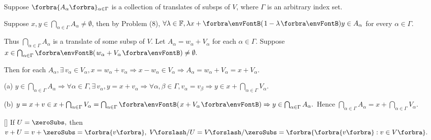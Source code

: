 \par\quad
Suppose $\Bra{A_{\alpha}}{_{\alpha\in\Gamma}}$ is a collection of translates of subsps of $V$, where $\Gamma$ is an arbitrary index set.\vspace{8pt}\par\quad
Suppose $x,y\in\bigcap_{\alpha\in\Gamma}A_{\alpha}\neq\emptyset$, then by Problem (8), $\forall\lambda\in\Fbb,\lambda x+\Par{1-\lambda}y\in A_{\alpha}$ for every $\alpha\in\Gamma$.\par\quad
Thus $\bigcap_{\alpha\in\Gamma}A_\alpha$ is a translate of some subsp of $V$.\PfEnd\vspace{6pt}\quad
\Or Let $A_\alpha=w_\alpha+V_\alpha$ for each $\alpha\in\Gamma$. Suppose $x\in\bigcap_{\alpha\in\Gamma}\Par{w_\alpha+V_\alpha}\neq\emptyset.$\par\quad
Then for each $A_\alpha,\exists\,v_\alpha\in V_\alpha,x=w_\alpha+v_\alpha\Rightarrow x-w_\alpha\in V_\alpha\Rightarrow A_\alpha=w_\alpha+V_\alpha=x+V_\alpha.$\vspace{3pt}\par\quad
(a) $y\in\bigcap_{\alpha\in\Gamma}A_\alpha\Rightarrow\forall\alpha\in\Gamma,\exists\,v_\alpha,y=x+v_\alpha\Rightarrow\forall\alpha,\beta\in\Gamma,v_\alpha=v_\beta\Rightarrow y\in x+\bigcap_{\alpha\in\Gamma}V_\alpha.$\vspace{3pt}\par\quad
(b) $y=x+v\in x+\bigcap_{\alpha\in\Gamma}V_\alpha=\bigcap_{\alpha\in\Gamma}\Par{x+V_\alpha}\Rightarrow y\in\bigcap_{\alpha\in\Gamma}A_\alpha.$ Hence $\bigcap_{\alpha\in\Gamma}A_\alpha=x+\bigcap_{\alpha\in\Gamma}V_\alpha.$\PfEnd
\SepLine

\ProblemBnoor[]{\NoteForSmall{[3.79, 3.83]}}[]{
	{If $U=\zeroSubs,$ then $v+U=v+\zeroSubs=\Bra{v},\;V\XSlash U=V\XSlash\zeroSubs=\Bra{\Bra{v}:v\in V}.$}\TextB{\vspace{-3pt}}
}\SepLine\pagebreak

